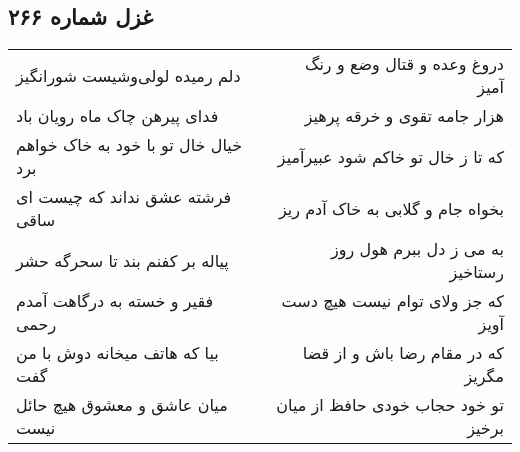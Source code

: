 \begin{center}
\section*{غزل شماره ۲۶۶}
\label{sec:sh266}
\begin{longtable}{l p{0.5cm} r}
دلم رمیده لولی‌وشیست شورانگیز
&&
دروغ وعده و قتال وضع و رنگ آمیز
\\
فدای پیرهن چاک ماه رویان باد
&&
هزار جامه تقوی و خرقه پرهیز
\\
خیال خال تو با خود به خاک خواهم برد
&&
که تا ز خال تو خاکم شود عبیرآمیز
\\
فرشته عشق نداند که چیست ای ساقی
&&
بخواه جام و گلابی به خاک آدم ریز
\\
پیاله بر کفنم بند تا سحرگه حشر
&&
به می ز دل ببرم هول روز رستاخیز
\\
فقیر و خسته به درگاهت آمدم رحمی
&&
که جز ولای توام نیست هیچ دست آویز
\\
بیا که هاتف میخانه دوش با من گفت
&&
که در مقام رضا باش و از قضا مگریز
\\
میان عاشق و معشوق هیچ حائل نیست
&&
تو خود حجاب خودی حافظ از میان برخیز
\\
\end{longtable}
\end{center}
